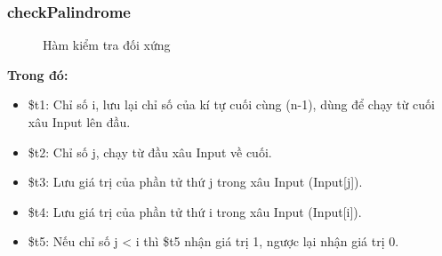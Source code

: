 \documentclass[a4paper,12pt]{article}
\begin{document}
\subsubsection{checkPalindrome}
\begin{figure}[!h]
    \centerline{}
	\label{fig:bai6}
\end{figure}
\begin{figure}[!h]
	\centerline{}
	\caption{Hàm kiểm tra đối xứng}
	\label{fig:bai6}
\end{figure}
\noindent
\textbf{Trong đó: }
\begin{itemize}
    \item \$t1: Chỉ số i, lưu lại chỉ số của kí tự cuối cùng (n-1), dùng để chạy từ cuối xâu Input lên đầu.
    \item \$t2: Chỉ số j, chạy từ đầu xâu Input về cuối.
    \item \$t3: Lưu giá trị của phần tử thứ j trong xâu Input (Input[j]).
    \item \$t4: Lưu giá trị của phần tử thứ i trong xâu Input (Input[i]).
    \item \$t5: Nếu chỉ số j < i thì \$t5 nhận giá trị 1, ngược lại nhận giá trị 0.
\end{itemize}
\end{document}
